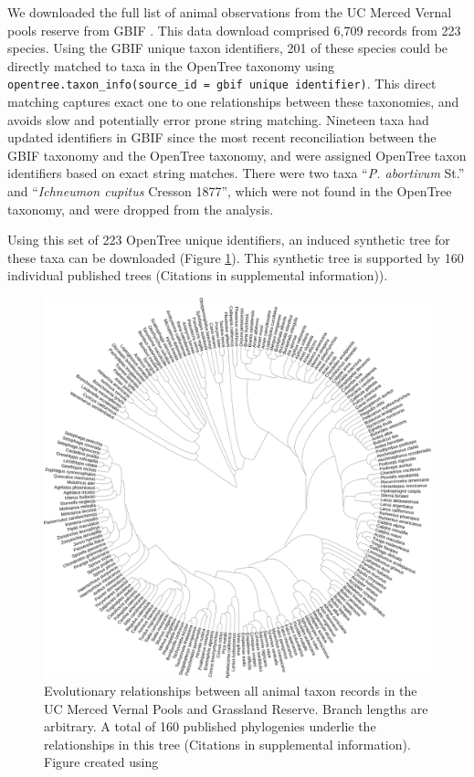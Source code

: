 \documentclass[oupdraft]{sysbio_sse}
\begin{document}
We downloaded the full list of animal observations from the UC Merced Vernal pools reserve from GBIF \citep{gbif_secretariat_gbif_2019}. This data download comprised 6,709 records from 223 species. Using the GBIF unique taxon identifiers, 201 of these species could be directly matched to taxa in the OpenTree taxonomy using \texttt{opentree.taxon\_info(source\_id = {gbif unique identifier})}. This direct matching captures exact one to one relationships between these taxonomies, and avoids slow and potentially error prone string matching. Nineteen taxa had updated identifiers in GBIF since the most recent reconciliation between the GBIF taxonomy and the OpenTree taxonomy, and were assigned OpenTree taxon identifiers based on exact string matches. There were two taxa ``\textit{P. abortivum} St.'' and ``\textit{Ichneumon cupitus} Cresson 1877'', which were not found in the OpenTree taxonomy, and were dropped from the analysis.


Using this set of 223 OpenTree unique identifiers, an induced synthetic tree for these taxa can be downloaded (Figure \ref{vernalanimals}). This synthetic tree is supported by 160 individual published trees (Citations in supplemental information)).

\begin{figure}[!h]
\centering\includegraphics[width=\textwidth]{vernal_animals}
\caption{Evolutionary relationships between all animal taxon records in the UC Merced Vernal Pools and Grassland Reserve. Branch lengths are arbitrary. A total of 160 published phylogenies underlie the relationships in this tree (Citations in supplemental information). Figure created using \citep{letunic_interactive_2019}}
\label{vernalanimals}
\end{figure}
\end{document}
